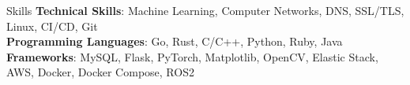 \documentclass{resume} %
\begin{document}
\begin{rSection}{Skills}
    {\bf Technical Skills}: Machine Learning, Computer Networks, DNS, SSL/TLS, Linux, CI/CD, Git\\
    {\bf Programming Languages}: Go, Rust, C/C++, Python, Ruby, Java\\
    {\bf Frameworks}: MySQL, Flask, PyTorch, Matplotlib, OpenCV, Elastic Stack, AWS, Docker, Docker Compose, ROS2\\
\end{rSection}
\end{document}

